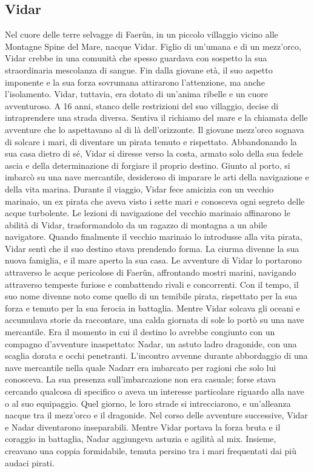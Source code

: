 \documentclass{article}
\begin{document}
\subsection{Vidar}Nel cuore delle terre selvagge di Faerûn, in un piccolo villaggio vicino alle Montagne Spine del Mare, nacque Vidar. Figlio di un'umana e di un mezz'orco, Vidar crebbe in una comunità che spesso guardava con sospetto la sua straordinaria mescolanza di sangue. Fin dalla giovane età, il suo aspetto imponente e la sua forza sovrumana attirarono l'attenzione, ma anche l'isolamento. Vidar, tuttavia, era dotato di un'anima ribelle e un cuore avventuroso. A 16 anni, stanco delle restrizioni del suo villaggio, decise di intraprendere una strada diversa. Sentiva il richiamo del mare e la chiamata delle avventure che lo aspettavano al di là dell'orizzonte. Il giovane mezz'orco sognava di solcare i mari, di diventare un pirata temuto e rispettato. Abbandonando la sua casa dietro di sé, Vidar si diresse verso la costa, armato solo della sua fedele ascia e della determinazione di forgiare il proprio destino. Giunto al porto, si imbarcò su una nave mercantile, desideroso di imparare le arti della navigazione e della vita marina. Durante il viaggio, Vidar fece amicizia con un vecchio marinaio, un ex pirata che aveva visto i sette mari e conosceva ogni segreto delle acque turbolente. Le lezioni di navigazione del vecchio marinaio affinarono le abilità di Vidar, trasformandolo da un ragazzo di montagna a un abile navigatore. Quando finalmente il vecchio marinaio lo introdusse alla vita pirata, Vidar sentì che il suo destino stava prendendo forma. La ciurma divenne la sua nuova famiglia, e il mare aperto la sua casa. Le avventure di Vidar lo portarono attraverso le acque pericolose di Faerûn, affrontando mostri marini, navigando attraverso tempeste furiose e combattendo rivali e concorrenti. Con il tempo, il suo nome divenne noto come quello di un temibile pirata, rispettato per la sua forza e temuto per la sua ferocia in battaglia. Mentre Vidar solcava gli oceani e accumulava storie da raccontare, una calda giornata di sole lo portò su una nave mercantile. Era il momento in cui il destino lo avrebbe congiunto con un compagno d'avventure inaspettato: Nadar, un astuto ladro dragonide, con una scaglia dorata e occhi penetranti.  L'incontro avvenne durante abbordaggio di una nave mercantile nella quale Nadarr era imbarcato per ragioni che solo lui conosceva. La sua presenza sull'imbarcazione non era casuale; forse stava cercando qualcosa di specifico o aveva un interesse particolare riguardo alla nave o al suo equipaggio. Quel giorno, le loro strade si intrecciarono, e un'alleanza nacque tra il mezz'orco e il dragonide. Nel corso delle avventure successive, Vidar e Nadar diventarono inseparabili. Mentre Vidar portava la forza bruta e il coraggio in battaglia, Nadar aggiungeva astuzia e agilità al mix. Insieme, creavano una coppia formidabile, temuta persino tra i mari frequentati dai più audaci pirati.
\end{document}
